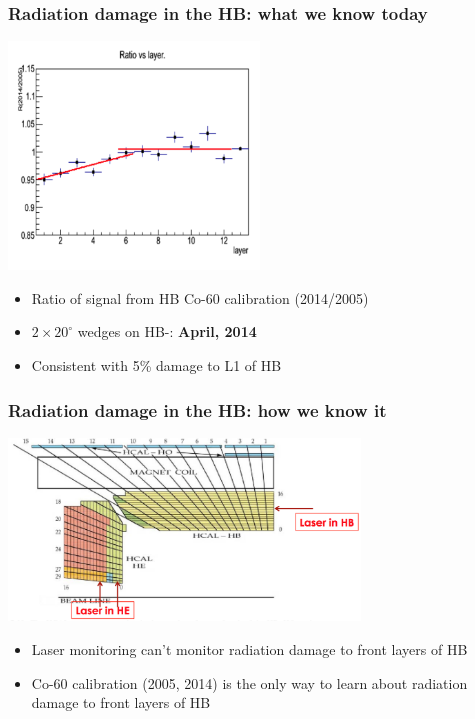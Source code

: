 \documentclass[bigger]{beamer}
\providecommand{\alert}[1]{\textbf{#1}}
\begin{document}
\begin{frame}
\frametitle{Radiation damage in the HB: what we know today}
\label{sec-2-2-3}
\label{sec-2-2-3-1}

\centering
\includegraphics[width=0.50\textwidth]{fig/radHB.png}
\begin{itemize}

\item Ratio of signal from HB Co-60 calibration (2014/2005)
\label{sec-2-2-3-2}%

\item $2 \times 20^{\circ}$ wedges on HB-: \alert{April, 2014}
\label{sec-2-2-3-3}%

\item Consistent with 5\% damage to L1 of HB
\label{sec-2-2-3-4}%
\end{itemize} %
\end{frame}
\begin{frame}
\frametitle{Radiation damage in the HB: how we know it}
\label{sec-2-2-4}
\label{sec-2-2-4-1}

\centering
\includegraphics[width=0.7\textwidth]{fig/laserInsert.png}
\begin{itemize}

\item Laser monitoring can't monitor radiation damage to front layers of HB
\label{sec-2-2-4-2}%

\item Co-60 calibration (2005, 2014) is the only way to learn about radiation damage to front layers of HB
\label{sec-2-2-4-3}%
\end{itemize} %
\end{frame}
\end{document}
